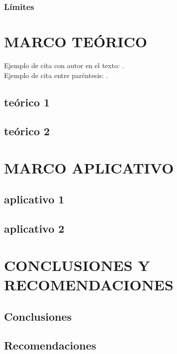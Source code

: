 \documentclass[11pt,oneside,letterpaper]{book}
\begin{document}
            \subsection{Límites}
            \lipsum[1]

	\chapter{MARCO TEÓRICO}
	\lipsum[1-2]
	Ejemplo de cita con autor en el texto: \textcite{perez2021educacion}.\\
	Ejemplo de cita entre paréntesis: \parencite{smith2020ai}.
        \section{teórico 1}
        \lipsum[1]

        \section{teórico 2}
        \lipsum[1]

	\chapter{MARCO APLICATIVO}
	\lipsum[1]

        \section{aplicativo 1}
        \lipsum[1]

        \section{aplicativo 2}
        \lipsum[1]

	\chapter{CONCLUSIONES Y RECOMENDACIONES}

        \section{Conclusiones}
        \lipsum[1]

        \section{Recomendaciones}
        \lipsum[1]

        \printbibliography[
          heading=bibintoc,         %
          title={BIBLIOGRAFÍA}      %
        ]
\end{document}
